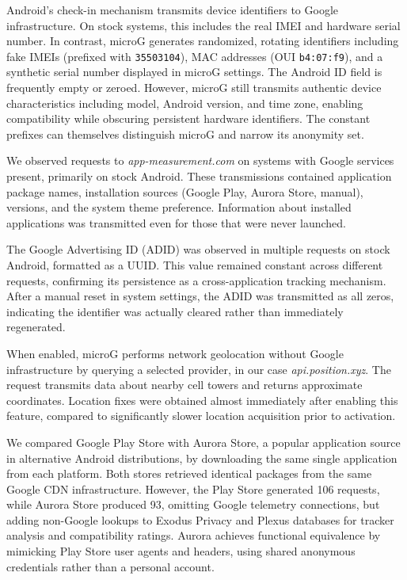 \documentclass[runningheads]{llncs}
\begin{document}
Android's check-in mechanism transmits device identifiers to Google infrastructure. On stock systems, this includes the real IMEI and hardware serial number. In contrast, microG generates randomized, rotating identifiers including fake IMEIs (prefixed with \texttt{35503104}), MAC addresses (OUI \texttt{b4:07:f9}), and a synthetic serial number displayed in microG settings. The Android ID field is frequently empty or zeroed. However, microG still transmits authentic device characteristics including model, Android version, and time zone, enabling compatibility while obscuring persistent hardware identifiers. The constant prefixes can themselves distinguish microG and narrow its anonymity set.

We observed requests to \textit{app-measurement.com} on systems with Google services present, primarily on stock Android. These transmissions contained application package names, installation sources (Google Play, Aurora Store, manual), versions, and the system theme preference. Information about installed applications was transmitted even for those that were never launched.

The Google Advertising ID (ADID) was observed in multiple requests on stock Android, formatted as a UUID. This value remained constant across different requests, confirming its persistence as a cross-application tracking mechanism. After a manual reset in system settings, the ADID was transmitted as all zeros, indicating the identifier was actually cleared rather than immediately regenerated.

When enabled, microG performs network geolocation without Google infrastructure by querying a selected provider, in our case \textit{api.position.xyz}. The request transmits data about nearby cell towers and returns approximate coordinates. Location fixes were obtained almost immediately after enabling this feature, compared to significantly slower location acquisition prior to activation.

We compared Google Play Store with Aurora Store, a popular application source in alternative Android distributions, by downloading the same single application from each platform. Both stores retrieved identical packages from the same Google CDN infrastructure. However, the Play Store generated 106 requests, while Aurora Store produced 93, omitting Google telemetry connections, but adding non-Google lookups to Exodus Privacy and Plexus databases for tracker analysis and compatibility ratings. Aurora achieves functional equivalence by mimicking Play Store user agents and headers, using shared anonymous credentials rather than a personal account.
\end{document}
